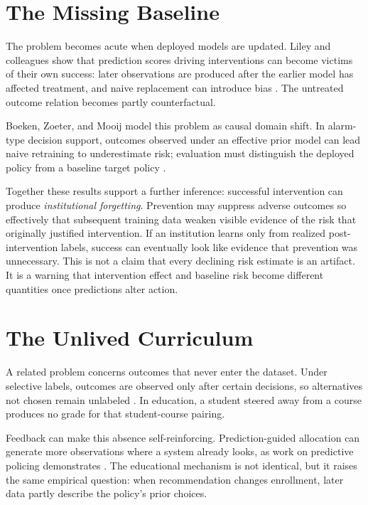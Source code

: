 \documentclass[11pt]{article}
\begin{document}
\section{The Missing Baseline}
The problem becomes acute when deployed models are updated. Liley and colleagues
show that prediction scores driving interventions can become victims of their own
success: later observations are produced after the earlier model has affected
treatment, and naive replacement can introduce bias
\parencite{pmlr-v130-liley21a}. The untreated outcome relation becomes partly
counterfactual.

Boeken, Zoeter, and Mooij model this problem as causal domain shift. In alarm-type
decision support, outcomes observed under an effective prior model can lead naive
retraining to underestimate risk; evaluation must distinguish the deployed policy
from a baseline target policy \parencite{pmlr-v236-boeken24a}.

Together these results support a further inference: successful intervention can
produce \emph{institutional forgetting}. Prevention may suppress adverse outcomes
so effectively that subsequent training data weaken visible evidence of the risk
that originally justified intervention. If an institution learns only from realized
post-intervention labels, success can eventually look like evidence that prevention
was unnecessary. This is not a claim that every declining risk estimate is an
artifact. It is a warning that intervention effect and baseline risk become
different quantities once predictions alter action.

\section{The Unlived Curriculum}
A related problem concerns outcomes that never enter the dataset. Under selective
labels, outcomes are observed only after certain decisions, so alternatives not
chosen remain unlabeled \parencite{kleinberg2018human}. In education, a student
steered away from a course produces no grade for that student-course pairing.

Feedback can make this absence self-reinforcing. Prediction-guided allocation can
generate more observations where a system already looks, as work on predictive
policing demonstrates \parencite{ensign2018runaway}. The educational mechanism is
not identical, but it raises the same empirical question: when recommendation
changes enrollment, later data partly describe the policy's prior choices.
\end{document}
